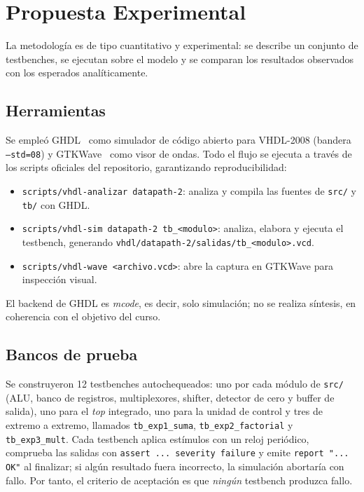 \documentclass[llncs]{llncs}
\begin{document}
\section{Propuesta Experimental}
\label{sec:propuesta}

La metodología es de tipo cuantitativo y experimental: se describe un
conjunto de testbenches, se ejecutan sobre el modelo y se comparan los
resultados observados con los esperados analíticamente.

\subsection{Herramientas}

Se empleó GHDL~\cite{ghdl-docs} como simulador de código abierto para
VHDL-2008 (bandera \texttt{--std=08}) y GTKWave~\cite{gtkwave-docs} como
visor de ondas. Todo el flujo se ejecuta a través de los scripts oficiales del
repositorio, garantizando reproducibilidad:

\begin{itemize}
  \item \texttt{scripts/vhdl-analizar datapath-2}: analiza y compila las
  fuentes de \texttt{src/} y \texttt{tb/} con GHDL.
  \item \texttt{scripts/vhdl-sim datapath-2 tb\_<modulo>}: analiza, elabora y
  ejecuta el testbench, generando
  \texttt{vhdl/datapath-2/salidas/tb\_<modulo>.vcd}.
  \item \texttt{scripts/vhdl-wave <archivo.vcd>}: abre la captura en GTKWave
  para inspección visual.
\end{itemize}

El backend de GHDL es \emph{mcode}, es decir, solo simulación; no se realiza
síntesis, en coherencia con el objetivo del curso.

\subsection{Bancos de prueba}

Se construyeron 12 testbenches autochequeados: uno por cada módulo de
\texttt{src/} (ALU, banco de registros, multiplexores, shifter,
detector de cero y buffer de salida), uno para el \emph{top} integrado, uno
para la unidad de control y tres de extremo a extremo, llamados
\texttt{tb\_exp1\_suma}, \texttt{tb\_exp2\_factorial} y
\texttt{tb\_exp3\_mult}. Cada testbench aplica estímulos con un reloj
peri\-ódico, comprueba las salidas con
\texttt{assert ... severity failure} y emite \texttt{report "... OK"} al
finalizar; si algún resultado fuera incorrecto, la simulación abortaría con
fallo. Por tanto, el criterio de aceptación es que \emph{ningún} testbench
produzca fallo.
\end{document}
